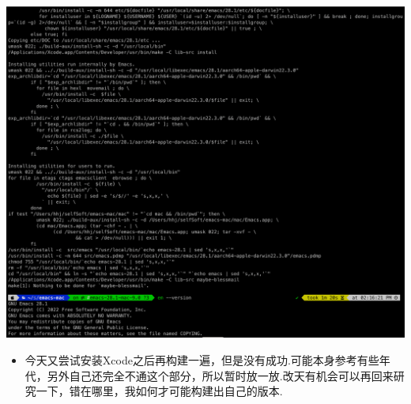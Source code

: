 \documentclass[9pt, b5paper]{article}
\begin{document}
\includegraphics[width=.9\linewidth]{./pic/readme_20230208_142554.png}
\begin{itemize}
\item 今天又尝试安装Xcode之后再构建一遍，但是没有成功.可能本身参考有些年代，另外自己还完全不通这个部分，所以暂时放一放.改天有机会可以再回来研究一下，错在哪里，我如何才可能构建出自己的版本.
\end{itemize}
\end{document}
